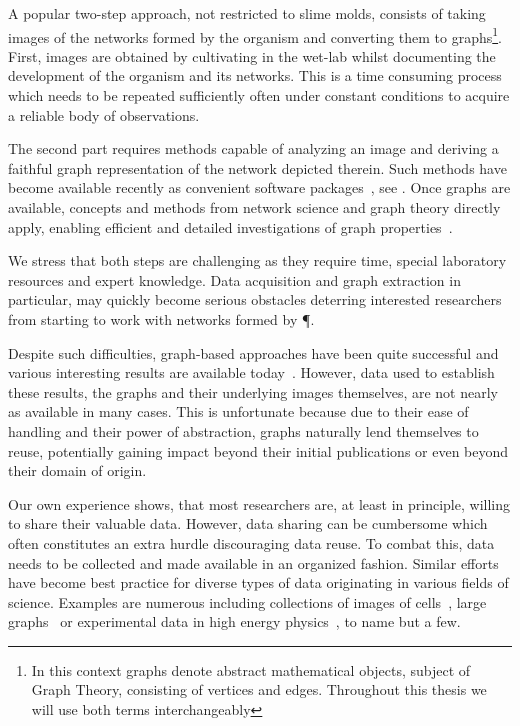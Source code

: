  	A popular two-step approach, not restricted to slime molds, consists of taking images of the networks formed by the organism and converting them to graphs\footnote{In this context graphs denote abstract mathematical objects, subject of Graph Theory, consisting of vertices and edges. Throughout this thesis we will use both terms interchangeably}. First, images are obtained by cultivating \Pp in the wet-lab whilst documenting the development of the organism and its networks. This is a time consuming process which needs to be repeated sufficiently often under constant conditions to acquire a reliable body of observations. 

 	The second part requires methods capable of analyzing an image and deriving a faithful graph representation of the network depicted therein. Such methods have become available recently as convenient software packages~\cite{dirnberger2015nefi}, see . Once graphs are available, concepts and methods from network science and graph theory directly apply, enabling efficient and detailed investigations of graph properties~\cite{baumgarten2012computational,heaton2012analysis}.

 	We stress that both steps are challenging as they require time, special laboratory resources and expert knowledge. Data acquisition and graph extraction in particular, may quickly become serious obstacles deterring interested researchers from starting to work with networks formed by \P. 

 	Despite such difficulties, graph-based approaches have been quite successful and various interesting results are available today~\cite{baumgarten2010plasmodial,baumgarten2013functional,fessel2014analytical,fessel2012physarum,ito2011characterization}. However, data used to establish these results, \ie the graphs and their underlying images themselves, are not nearly as available in many cases. This is unfortunate because due to their ease of handling and their power of abstraction, graphs naturally lend themselves to reuse, potentially gaining impact beyond their initial publications or even beyond their domain of origin.

 	Our own experience shows, that most researchers are, at least in principle, willing to share their valuable data. However, data sharing can be cumbersome which often constitutes an extra hurdle discouraging data reuse. To combat this, data needs to be collected and made available in an organized fashion. Similar efforts have become best practice for diverse types of data originating in various fields of science. Examples are numerous including collections of images of cells~\cite{cell}, large graphs~\cite{snap} or experimental data in high energy physics~\cite{hepdata}, to name but a few.

